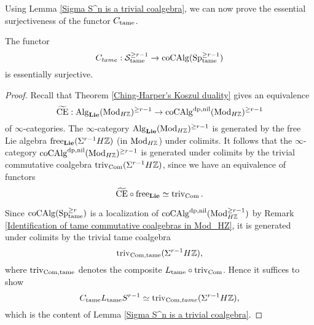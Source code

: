 Using Lemma \ref{Sigma S^n is a trivial coalgebra}, we can now prove the essential surjectiveness of the functor $C_{\tame}$.
\begin{lemma}
\label{Essential Surjectivity of C_tame}
	The functor 
	$$
	C_{tame}: \CS^{\geq r-1}_{\tame}  
	\to 
	\coCAlg(\Sp^{\geq r-1}_{\tame})
	$$
	is essentially surjective.
\end{lemma}
\begin{proof}
Recall that Theorem \ref{Ching-Harper's Koszul duality}
gives an equivalence
$$
\tildeCE: \Alg_{\spLie}(\Mod_{H\BZ})^{\geq r-1} \to \coCAlg^{\divpow, \nil}(\Mod_{H\BZ})^{\geq r-1}
$$
of $\infty$-categories. The $\infty$-category $\Alg_{\spLie}(\Mod_{H\BZ})^{\geq r-1}$ is generated by the free Lie algebra $\Free_{\spLie}(\Sigma^{r-1} H\BZ)$ (in $\Mod_{H\BZ}$) under colimits.
 It follows that the $\infty$-category $\coCAlg^{\divpow, \nil}(\Mod_{H\BZ})^{\geq r-1}$ is generated under colimits by the trivial commutative coalgebra $\trivial_{\Com}(\Sigma^{r-1}H \BZ)$, since we have an equivalence of functors
$$
\tildeCE \circ \Free_{\spLie} \simeq \trivial_{\Com}.
$$

Since $\coCAlg(\Sp^{\geq r}_{\tame})$ is
a localization of $\coCAlg^{\divpow, \nil}(\Mod_{H\BZ}^{\geq r-1})$ by Remark \ref{Identification of tame commutative coalgebras in Mod_HZ},
it is generated under colimits by the trivial tame coalgebra 
$$
\trivial_{\Com,\tame}(\Sigma^{r-1}H \BZ),
$$ 
where $\trivial_{\Com,\tame}$ denotes the composite $L_{\tame}\circ \trivial_{\Com}$.
Hence it suffices to show 
$$
C_{\tame} L_{\tame}S^{r-1}\simeq
\trivial_{\Com,tame}(\Sigma^{r-1}H \BZ),
$$ which is the content of Lemma \ref{Sigma S^n is a trivial coalgebra}.

\end{proof}







